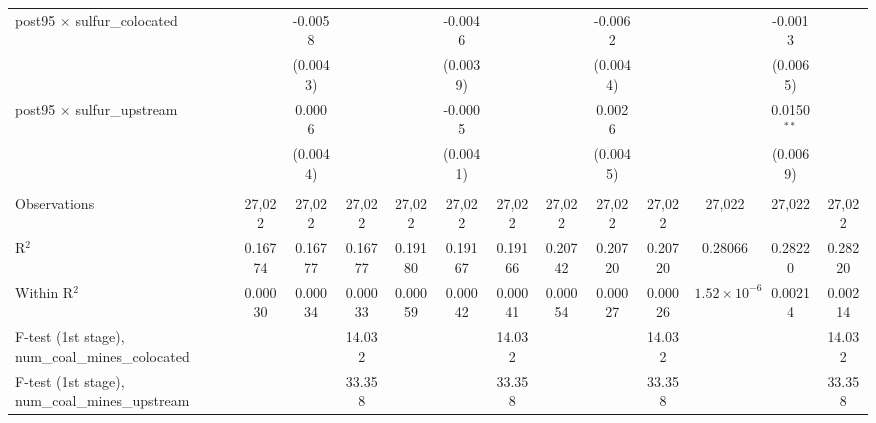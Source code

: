 \begin{table}[htbp]
\begin{adjustbox}{width = \textwidth, center}
\begin{tabular}{lcccccccccccc}
         post95 $\times$ sulfur\_colocated                  &                & -0.0058        &               &                & -0.0046       &               &               & -0.0062       &               &                        & -0.0013       &   \\   
                                                            &                & (0.0043)       &               &                & (0.0039)      &               &               & (0.0044)      &               &                        & (0.0065)      &   \\   
         post95 $\times$ sulfur\_upstream                   &                & 0.0006         &               &                & -0.0005       &               &               & 0.0026        &               &                        & 0.0150$^{**}$ &   \\   
                                                            &                & (0.0044)       &               &                & (0.0041)      &               &               & (0.0045)      &               &                        & (0.0069)      &   \\   
          \\
         Observations                                       & 27,022         & 27,022         & 27,022        & 27,022         & 27,022        & 27,022        & 27,022        & 27,022        & 27,022        & 27,022                 & 27,022        & 27,022\\  
         R$^2$                                              & 0.16774        & 0.16777        & 0.16777       & 0.19180        & 0.19167       & 0.19166       & 0.20742       & 0.20720       & 0.20720       & 0.28066                & 0.28220       & 0.28220\\  
         Within R$^2$                                       & 0.00030        & 0.00034        & 0.00033       & 0.00059        & 0.00042       & 0.00041       & 0.00054       & 0.00027       & 0.00026       & $1.52\times 10^{-6}$   & 0.00214       & 0.00214\\  
         F-test (1st stage), num\_coal\_mines\_colocated    &                &                & 14.032        &                &               & 14.032        &               &               & 14.032        &                        &               & 14.032\\  
         F-test (1st stage), num\_coal\_mines\_upstream     &                &                & 33.358        &                &               & 33.358        &               &               & 33.358        &                        &               & 33.358\\  

\end{tabular}
\end{adjustbox}
\end{table}
